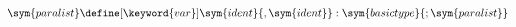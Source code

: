\[
	\sym{paralist} \define
		[ \keyword{var} ] \sym{ident} \{, \sym{ident} \}: \sym{basictype} \{; \sym{paralist} \}
\]